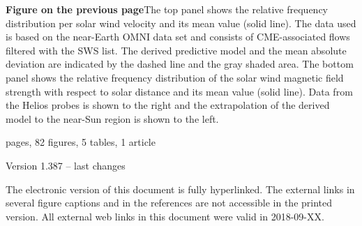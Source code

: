 \newpage

\vspace*{\fill}
\begin{small}
	\noindent \textbf{Figure on the previous page}\quad The top panel shows the relative \Kp{} frequency distribution per solar wind velocity and its mean value (solid line). The data used is based on the near-Earth OMNI data set and consists of CME-associated flows filtered with the SWS list. The derived predictive model and the mean absolute deviation are indicated by the dashed line and the gray shaded area.
	The bottom panel shows the relative frequency distribution of the solar wind magnetic field strength with respect to solar distance and its mean value (solid line). Data from the Helios probes is shown to the right and the extrapolation of the derived model to the near-Sun region is shown to the left.



	
	\vspace{1\baselineskip}
	
	 pages, 82 figures, 5 tables, 1 article

	\noindent Version 1.387 -- last changes \ISOToday{} \thistime{}
	
	\vspace{1\baselineskip}
	
	\noindent The electronic version of this document is fully hyperlinked. The external links in several figure captions and in the references are not accessible in the printed version. All external web links in this document were valid in 2018-09-XX.
\end{small}

\normalsize

